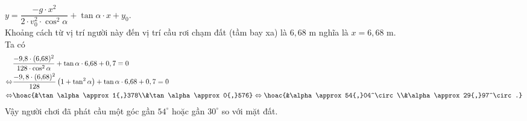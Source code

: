 \begin{ex}
{		$y=\dfrac{-g\cdot  x^2}{2\cdot v_0^2\cdot \cos^2\alpha}+\tan\alpha \cdot x+y_0$.\\
		Khoảng cách từ vị trí người này đến vị trí cầu rơi chạm đất (tầm bay xa) là $6{,}68$ m nghĩa là $x=6{,}68$ m.\\ 
		 Ta có
		\begin{align*}
			&\dfrac{-9{,}8\cdot (6{,}68)^2}{128\cdot \cos^2\alpha  }+\tan\alpha\cdot 6{,}68+0,7=0\\
			\Leftrightarrow& \dfrac{-9,8\cdot (6{,}68)^2}{128}\left( 1+\tan^2\alpha \right)+\tan\alpha\cdot 6{,}68+0,7=0\\ 
			\Leftrightarrow& 
			\hoac{&\tan\alpha \approx  1{,}378\\&\tan\alpha \approx 0{,}576} \Leftrightarrow
			\hoac{&\alpha  \approx 54{,}04^\circ\\&\alpha \approx 29{,}97^\circ.}
		\end{align*}
		Vậy người chơi đã phát cầu một góc gần $54^\circ $ hoặc gần  $30^\circ $ so với mặt đất.
	 }
\end{ex}

